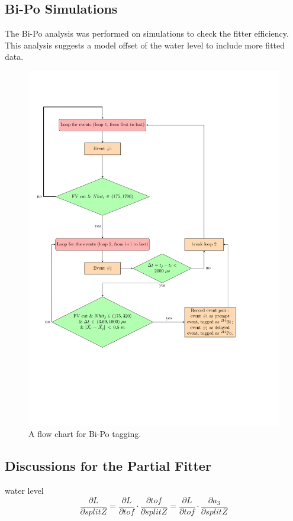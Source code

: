 \subsection{Bi-Po Simulations}
The Bi-Po analysis was performed on simulations to check the fitter efficiency. This analysis suggests a model offset of the water level to include more fitted data.
\begin{figure}[!htb]
	\centering
	\includegraphics[width=15cm]{flowchart_latex.pdf}
	\caption{A flow chart for Bi-Po tagging.}
	\label{biPo_flowchart}
\end{figure}


\subsection{Discussions for the Partial Fitter}
water level
\[
\frac{\partial L}{\partial splitZ} = \frac{\partial L}{\partial tof}\cdot\frac{\partial tof}{\partial splitZ}=\frac{\partial L}{\partial tof}\cdot\frac{\partial a_3}{\partial splitZ}
\]

